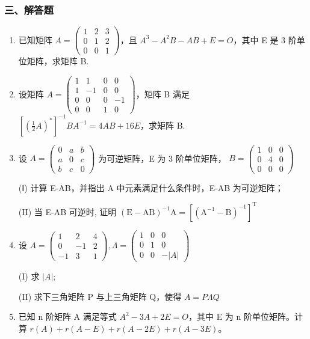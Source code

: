\documentclass[12pt, a4paper]{ctexart}
\begin{document}
\subsubsection*{三、解答题}

\begin{enumerate}[start=15]
    \item 已知矩阵 $ A = \begin{pmatrix} 1 & 2 & 3 \\ 0 & 1 & 2 \\ 0 & 0 & 1 \end{pmatrix} $，且 $ A^{3} - A^{2}B - AB + E = O $，其中 E 是 3 阶单位矩阵，求矩阵 B.

    \item 设矩阵 $ A = \begin{pmatrix} 1 & 1 & 0 & 0 \\ 1 & -1 & 0 & 0 \\ 0 & 0 & 0 & -1 \\ 0 & 0 & 1 & 0 \end{pmatrix} $，矩阵 B 满足 $ \left[\left(\frac{1}{2}A\right)^{*}\right]^{-1}BA^{-1} = 4AB + 16E $，求矩阵 B.

    \item 设 $ A=\begin{pmatrix}0&a&b\\a&0&c\\b&c&0\end{pmatrix} $ 为可逆矩阵，E 为 3 阶单位矩阵， $ B=\begin{pmatrix}1&0&0\\0&4&0\\0&0&0\end{pmatrix} $
    
    (Ⅰ) 计算 E-AB，并指出 A 中元素满足什么条件时，E-AB 为可逆矩阵；
    
    (II) 当 E-AB 可逆时, 证明 $ \left(\mathrm{E}-\mathrm{AB}\right)^{-1}\mathrm{A}=\left[\left(\mathrm{A}^{-1}-\mathrm{B}\right)^{-1}\right]^{\mathrm{T}} $

    \item 设 $ A=\begin{pmatrix}1&2&4\\0&-1&2\\-1&3&1\end{pmatrix},\Lambda=\begin{pmatrix}1&0&0\\0&1&0\\0&0&-|A|\end{pmatrix} $
    
    (I) 求 $ \left|A\right| $;
    
    (II) 求下三角矩阵 P 与上三角矩阵 Q，使得 $ A = P \Lambda Q $

    \item 已知 n 阶矩阵 A 满足等式 $ A^2 - 3A + 2E = O $，其中 E 为 n 阶单位矩阵。计算 $ r(A) + r(A - E) + r(A - 2E) + r(A - 3E) $。
\end{enumerate}
\end{document}
